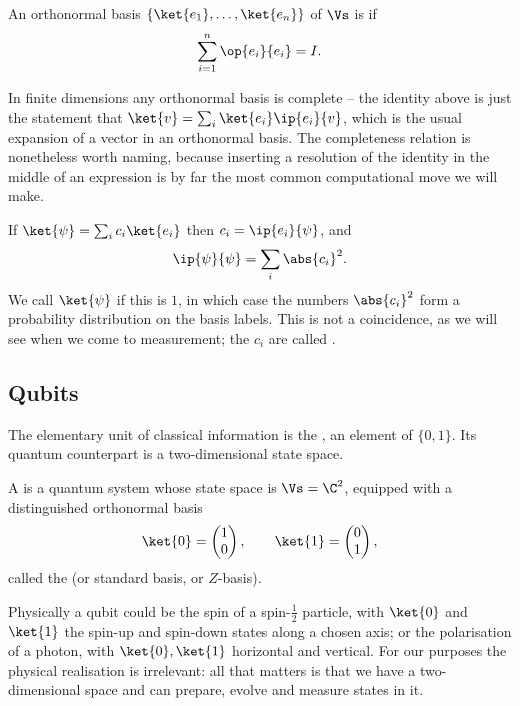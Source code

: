 \begin{definition}
	An orthonormal basis $\{\ket{e_1}, \dots, \ket{e_n}\}$ of $\Vs$ is  if
	$$\sum_{i = 1}^n \op{e_i}{e_i} = I.$$
\end{definition}

In finite dimensions any orthonormal basis is complete -- the identity above is just the statement that $\ket{v} = \sum_i \ket{e_i}\ip{e_i}{v}$, which is the usual expansion of a vector in an orthonormal basis. The completeness relation is nonetheless worth naming, because inserting a resolution of the identity in the middle of an expression is by far the most common computational move we will make.

If $\ket{\psi} = \sum_i c_i \ket{e_i}$ then $c_i = \ip{e_i}{\psi}$, and
$$\ip{\psi}{\psi} = \sum_i \abs{c_i}^2.$$
We call $\ket{\psi}$  if this is $1$, in which case the numbers $\abs{c_i}^2$ form a probability distribution on the basis labels. This is not a coincidence, as we will see when we come to measurement; the $c_i$ are called .

\subsection{Qubits}

The elementary unit of classical information is the , an element of $\{0,1\}$. Its quantum counterpart is a two-dimensional state space.

\begin{definition}[Qubit]
	A  is a quantum system whose state space is $\Vs = \C^2$, equipped with a distinguished orthonormal basis
	$$\ket{0} = \begin{pmatrix} 1 \\ 0\end{pmatrix}, \qquad \ket{1} = \begin{pmatrix} 0 \\ 1 \end{pmatrix},$$
	called the  (or standard basis, or $Z$-basis).
\end{definition}

Physically a qubit could be the spin of a spin-$\tfrac12$ particle, with $\ket{0}$ and $\ket{1}$ the spin-up and spin-down states along a chosen axis; or the polarisation of a photon, with $\ket{0}, \ket{1}$ horizontal and vertical. For our purposes the physical realisation is irrelevant: all that matters is that we have a two-dimensional space and can prepare, evolve and measure states in it.

